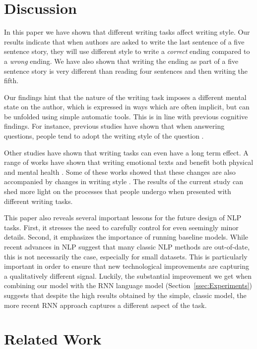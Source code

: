 \documentclass[11pt,a4paper]{article}
\newcommand{\secref}[1]{Section~\ref{ssec:#1}}
\newcommand{\isection}[2]{\section{#1}\label{ssec:#2}}
\newcommand{\isectionb}[1]{\section{#1}\label{ssec:#1}}
\begin{document}
\isectionb{Discussion}

In this paper we have shown that different writing tasks affect writing style. 
Our results indicate that when authors are asked to write the last sentence of a five sentence story, they will use different style to write a {\it correct} ending compared to a {\it wrong} ending. We have also shown that writing the ending as part of a five sentence story is very different than reading four sentences and then writing the fifth.

Our findings hint that the nature of the writing task imposes a different mental state on the author, which is expressed in ways which are often implicit, but can be unfolded using simple automatic tools. 
This is in line with previous cognitive findings. 
For instance, previous studies have shown that when answering questions, people  tend to adopt the writing style of the question \cite{Ireland:2010}.


Other studies have shown that writing tasks can even have a long term effect.
A range of works have shown that writing emotional texts and benefit both physical and mental health \cite{Lepore:2002,Frattaroli:2006}. 
Some of these works showed that these changes are also accompanied by changes in writing style \cite{Campbell:2003}. 
The results of the current study can shed more light on the processes that people undergo when presented with different writing tasks.


This paper also reveals several important lessons for the future design of NLP tasks. 
First, it stresses the need to carefully control for even seemingly minor details. 
Second, it emphasizes the importance of running baseline models.
While recent advances in NLP  suggest that many classic NLP methods are out-of-date, 
this is not necessarily the case, especially for small datasets.
This is particularly important in order to ensure that  new technological improvements are capturing a qualitatively different signal.
Luckily, the substantial improvement we get when combining our model with the RNN language model (\secref{Experiments}) suggests that despite the high results obtained by the simple, classic model, the more recent RNN approach captures a different aspect of the task.

\isection{Related Work}{Related}
\end{document}
